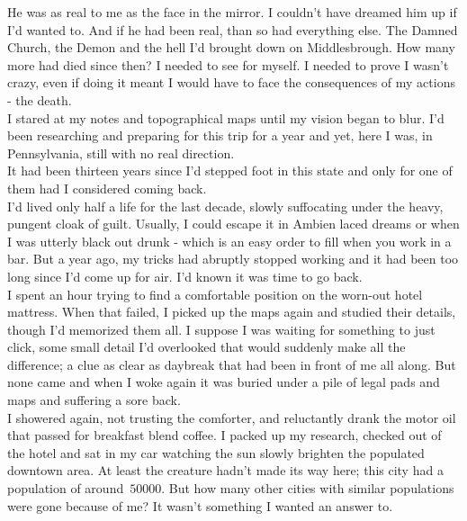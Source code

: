 \documentclass[a5paper]{scrartcl}
\begin{document}
He was as real to me as the face in the mirror. I couldn't have dreamed him up if I'd wanted to. And if he had been real, than so had everything else. The Damned Church, the Demon and the hell I'd brought down on Middlesbrough. How many more had died since then? I needed to see for myself. I needed to prove I wasn't crazy, even if doing it meant I would have to face the consequences of my actions - the death.  \\


I stared at my notes and topographical maps until my vision began to blur. I'd been researching and preparing for this trip for a year and yet, here I was, in Pennsylvania, still with no real direction.\\


It had been thirteen years since I'd stepped foot in this state and only for one of them had I considered coming back. \\


I'd lived only half a life for  the last decade, slowly suffocating under the heavy, pungent cloak of guilt. Usually, I could escape it in Ambien laced dreams or when I was utterly black out drunk - which is an easy order to fill when you work in a bar. But a year ago, my tricks had abruptly stopped working and it had been too long since I'd come up for air. I'd known it was time to go back.\\


I spent an hour trying to find a comfortable position on the worn-out hotel mattress. When that failed, I picked up the maps again and studied their details, though I'd memorized them all. I suppose I was waiting for something to just click, some small detail I'd overlooked that would suddenly make all the difference; a clue as clear as daybreak that had been in front of me all along. But none came and when I woke again it was buried under a pile of legal pads and maps and suffering a sore back.\\


I showered again, not trusting the comforter, and reluctantly drank the motor oil that passed for breakfast blend coffee. I packed up my research, checked out of the hotel and sat in my car watching the sun slowly brighten the populated downtown area. At least the creature hadn't made its way here; this city had a population of around~$\num{50000}$. But how many other cities with similar populations were gone because of me? It wasn't something I wanted an answer to.\\
\end{document}
